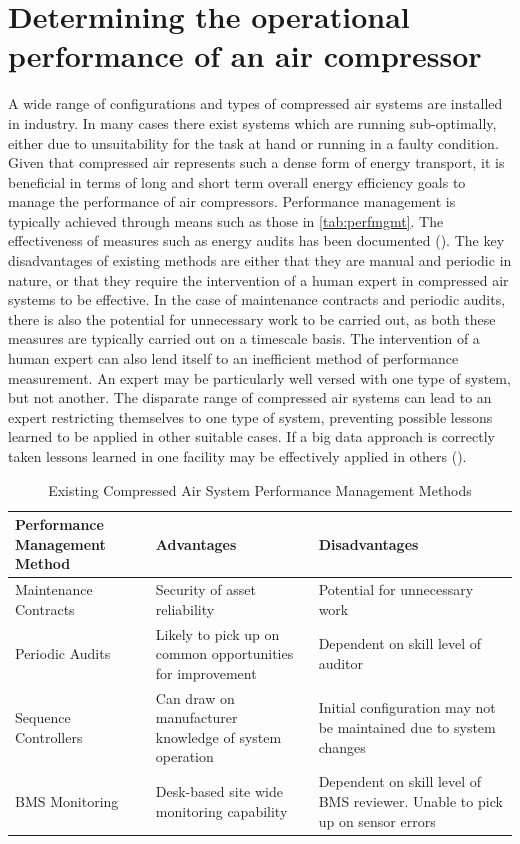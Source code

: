 \section{Determining the operational performance of an air compressor}
\label{sec:probstatement}
A wide range of configurations and types of compressed air systems are installed in industry. In many cases there exist systems which are running sub-optimally, either due to unsuitability for the task at hand or running in a faulty condition. Given that compressed air represents such a dense form of energy transport, it is beneficial in terms of long and short term overall energy efficiency goals to manage the performance of air compressors. Performance management is typically achieved through means such as those in  \autoref{tab:perfmgmt}. The effectiveness of measures such as energy audits has been documented (\cite{Fleiter2012}). The key disadvantages of existing methods are either that they are manual and periodic in nature, or that they require the intervention of a human expert in compressed air systems to be effective. In the case of maintenance contracts and periodic audits, there is also the potential for unnecessary work to be carried out, as both these measures are typically carried out on a timescale basis. The intervention of a human expert can also lend itself to an inefficient method of performance measurement. An expert may be particularly well versed with one type of system, but not another. The disparate range of compressed air systems can lead to an expert restricting themselves to one type of system, preventing possible lessons learned to be applied in other suitable cases. If a big data approach is correctly taken lessons learned in one facility may be effectively applied in others (\cite{ODonovan2015}). 

\begin{table}
  \centering
  \caption{Existing Compressed Air System Performance Management Methods}
    \begin{tabular}{p{.3\linewidth}|p{.3\linewidth}|p{.3\linewidth}}
    \toprule
    Performance Management Method & Advantages & Disadvantages \\
    \toprule
    Maintenance Contracts & Security of asset reliability & Potential for unnecessary work \\
    \midrule
    Periodic Audits & Likely to pick up on common opportunities for improvement & Dependent on skill level of auditor \\
    \midrule
    Sequence Controllers & Can draw on manufacturer knowledge of system operation & Initial configuration may not be maintained due to system changes \\
    \midrule
    BMS Monitoring & Desk-based site wide monitoring capability & Dependent on skill level of BMS reviewer. Unable to pick up on sensor errors \\
    \bottomrule
    \end{tabular}%
  \label{tab:perfmgmt}%
\end{table}%


